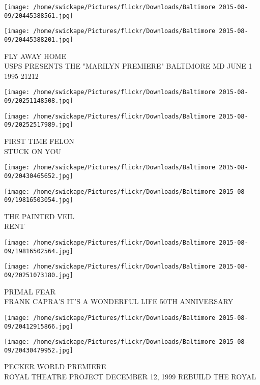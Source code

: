 \documentclass[10pt,letterpaper]{article}
\begin{document}
\texttt{[image: /home/swickape/Pictures/flickr/Downloads/Baltimore 2015-08-09/20445388561.jpg]}

\vspace{0.25in}
\texttt{[image: /home/swickape/Pictures/flickr/Downloads/Baltimore 2015-08-09/20445388201.jpg]}

FLY AWAY HOME\\
USPS PRESENTS THE "MARILYN PREMIERE" BALTIMORE MD JUNE 1 1995 21212\\
\pagebreak

\texttt{[image: /home/swickape/Pictures/flickr/Downloads/Baltimore 2015-08-09/20251148508.jpg]}

\vspace{0.25in}
\texttt{[image: /home/swickape/Pictures/flickr/Downloads/Baltimore 2015-08-09/20252517989.jpg]}

FIRST TIME FELON\\
STUCK ON YOU\\
\pagebreak

\texttt{[image: /home/swickape/Pictures/flickr/Downloads/Baltimore 2015-08-09/20430465652.jpg]}

\vspace{0.25in}
\texttt{[image: /home/swickape/Pictures/flickr/Downloads/Baltimore 2015-08-09/19816503054.jpg]}

THE PAINTED VEIL\\
RENT\\
\pagebreak

\texttt{[image: /home/swickape/Pictures/flickr/Downloads/Baltimore 2015-08-09/19816502564.jpg]}

\vspace{0.25in}
\texttt{[image: /home/swickape/Pictures/flickr/Downloads/Baltimore 2015-08-09/20251073180.jpg]}

PRIMAL FEAR\\
FRANK CAPRA'S IT'S A WONDERFUL LIFE 50TH ANNIVERSARY\\
\pagebreak

\texttt{[image: /home/swickape/Pictures/flickr/Downloads/Baltimore 2015-08-09/20412915866.jpg]}

\vspace{0.25in}
\texttt{[image: /home/swickape/Pictures/flickr/Downloads/Baltimore 2015-08-09/20430479952.jpg]}

PECKER WORLD PREMIERE\\
ROYAL THEATRE PROJECT DECEMBER 12, 1999 REBUILD THE ROYAL\\
\pagebreak
\end{document}

